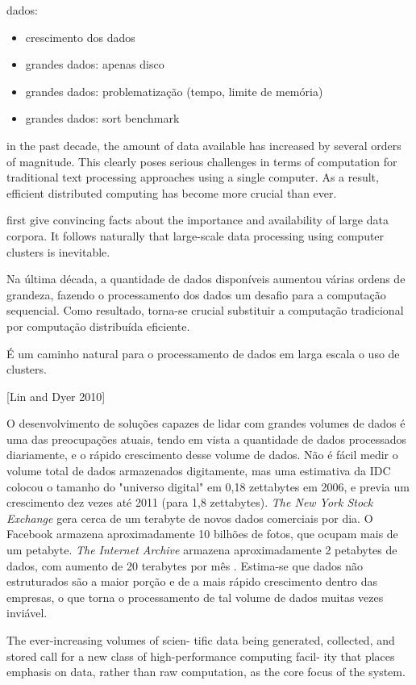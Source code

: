 dados: 
\begin{itemize}
\item crescimento dos dados
\item grandes dados: apenas disco
\item grandes dados: problematização (tempo, limite de memória)
\item grandes dados: sort benchmark
\end{itemize}

 in the past decade, the amount of data available has increased by several orders of magnitude. This clearly poses serious challenges in terms of computation for traditional text processing approaches using a single computer. As a result, efficient distributed computing has become more crucial than ever.
 
 first give convincing facts about the importance and availability of large data corpora. It follows naturally that large-scale data processing using computer clusters is inevitable.
 
 

Na última década, a quantidade de dados disponíveis aumentou várias ordens de grandeza, fazendo o processamento dos dados um desafio para a computação sequencial. Como resultado, torna-se crucial substituir a computação tradicional por computação distribuída eficiente. 

É um caminho natural para o processamento de dados em larga escala o uso de clusters.
  
[Lin and Dyer 2010]

O desenvolvimento de soluções capazes de lidar com grandes volumes de dados é uma das preocupações atuais, tendo em vista a quantidade de dados processados diariamente, e o rápido crescimento desse volume de dados.
Não é fácil medir o volume total de dados armazenados digitamente, mas uma estimativa da IDC colocou o tamanho do "universo digital" em 0,18 zettabytes em 2006, e previa um crescimento dez vezes até 2011 (para 1,8 zettabytes).
 \textit{The New York Stock Exchange} gera cerca de um terabyte de novos dados comerciais por dia. O Facebook armazena aproximadamente 10 bilhões de fotos, que ocupam mais de um petabyte. \textit{The Internet Archive} armazena aproximadamente 2 petabytes de dados, com aumento de 20 terabytes por mês
\citep{Hadoop:2010}. Estima-se que dados não estruturados são a maior porção e de a mais rápido crescimento dentro das empresas, o que torna o processamento de tal volume de dados muitas vezes inviável.


The ever-increasing volumes of scien- tific  data  being generated, collected, and stored call for a new class of high-performance computing facil- ity that places emphasis on data, rather than raw computation, as the core focus of the system.

